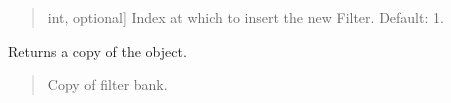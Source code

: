 \documentclass[letterpaper,10pt,english]{sphinxmanual}
\begin{document}
\begin{fulllineitems}
\begin{fulllineitems}
\begin{quote}
\begin{description}
\begin{description}
\sphinxlineitem{\sphinxstylestrong{index}}{[}int, optional{]}
\sphinxAtStartPar
Index at which to insert the new Filter. Default: \sphinxhyphen{}1.

\end{description}

\end{description}\end{quote}

\end{fulllineitems}


\begin{fulllineitems}
\label{\detokenize{classes:dsptools.classes.filterbank.FilterBank.copy}}
\pysigstartsignatures
{}
\pysigstopsignatures
\sphinxAtStartPar
Returns a copy of the object.
\begin{quote}\begin{description}
\begin{description}
\sphinxlineitem{\sphinxstylestrong{new\_sig}}{[}\sphinxtitleref{FilterBank}{]}
\sphinxAtStartPar
Copy of filter bank.

\end{description}

\end{description}\end{quote}

\end{fulllineitems}



\end{fulllineitems}
\end{document}
